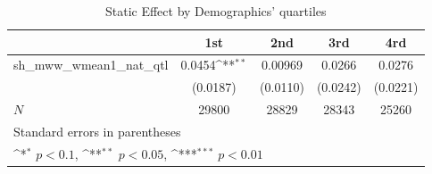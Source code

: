 \begin{table}[htbp]\centering
\def\sym#1{\ifmmode^{#1}\else\(^{#1}\)\fi}
\caption{Static Effect by Demographics' quartiles}
\begin{tabular}{l*{4}{c}}
\hline\hline
            &\multicolumn{1}{c}{1st}&\multicolumn{1}{c}{2nd}&\multicolumn{1}{c}{3rd}&\multicolumn{1}{c}{4rd}\\
\hline
sh\_mww\_wmean1\_nat\_qtl&      0.0454\sym{**} &     0.00969         &      0.0266         &      0.0276         \\
            &    (0.0187)         &    (0.0110)         &    (0.0242)         &    (0.0221)         \\
\hline
\(N\)       &       29800         &       28829         &       28343         &       25260         \\
\hline\hline
\multicolumn{5}{l}{\footnotesize Standard errors in parentheses}\\
\multicolumn{5}{l}{\footnotesize \sym{*} \(p<0.1\), \sym{**} \(p<0.05\), \sym{***} \(p<0.01\)}\\
\end{tabular}
\end{table}
